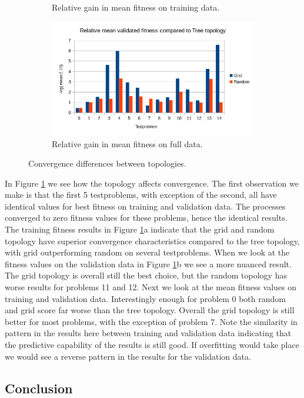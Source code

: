 \begin{figure}
\begin{subfigure}{0.6\textwidth}
        \caption{Relative gain in mean fitness on training data.}
    \end{subfigure}%
    \begin{subfigure}{0.6\textwidth}
    \centering
        \includegraphics[width=0.8\linewidth]{figures/distributedmeanvalidated.png}
        \caption{Relative gain in mean fitness on full data.}
    \end{subfigure}
    \caption{Convergence differences between topologies.}
    \label{fig:distributedresults}
    \end{figure}
In Figure \ref{fig:distributedresults} we see how the topology affects convergence. The first observation we make is that the first 5 testproblems, with exception of the second, all have identical values for best fitness on training and validation data. The processes converged to zero fitness values for these problems, hence the identical results. 
The training fitness results in Figure \ref{fig:distributedresults}a indicate that the grid and random topology have superior convergence characteristics compared to the tree topology, with grid outperforming random on several testproblems. When we look at the fitness values on the validation data in Figure \ref{fig:distributedresults}b we see a more nuanced result. The grid topology is overall still the best choice, but the random topology has worse results for problems 11 and 12.
Next we look at the mean fitness values on training and validation data. Interestingly enough for problem 0 both random and grid score far worse than the tree topology. Overall the grid topology is still better for most problems, with the exception of problem 7. Note the similarity in pattern in the results here between training and validation data indicating that the predictive capability of the results is still good. If overfitting would take place we would see a reverse pattern in the results for the validation data.
\subsection{Conclusion}
